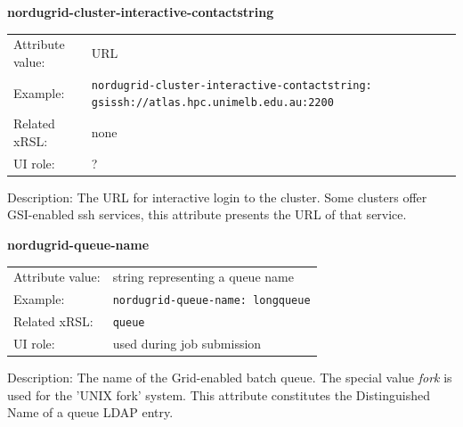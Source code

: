 \documentclass{article}
\begin{document}
  \hspace*{0.5cm}
  \begin{shaded}
    \textbf{nordugrid-cluster-interactive-contactstring}
  \end{shaded}
  \begin{tabular}{lp{10cm}}  
    Attribute value:& URL\\
    Example:& \verb#nordugrid-cluster-interactive-contactstring: gsissh://atlas.hpc.unimelb.edu.au:2200#\\
    Related xRSL:& none\\
    UI role:& ?\\
  \end{tabular}

Description: The URL for interactive login to the cluster.
Some clusters offer GSI-enabled ssh services, this attribute presents the
URL of that service.



  \hspace*{0.5cm}
  \begin{shaded}
    \textbf{nordugrid-queue-name}
  \end{shaded}
  \begin{tabular}{lp{10cm}}  
    Attribute value:& string representing a queue name\\
    Example:& \verb#nordugrid-queue-name: longqueue#\\
    Related xRSL:&  \verb#queue#\\
    UI role:& used during job submission\\
  \end{tabular}

Description: The name of the Grid-enabled batch queue.
The special value {\it fork} is used for the 'UNIX fork' system.
This attribute constitutes the Distinguished Name of a queue LDAP entry.

\end{document}
